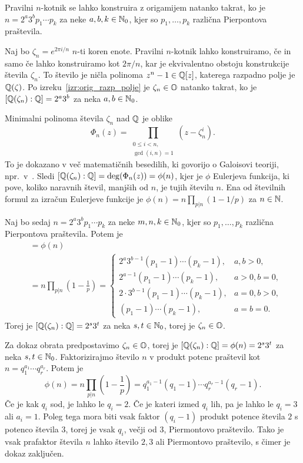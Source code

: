 \begin{izrek}
    Pravilni $n$-kotnik se lahko konstruira z origamijem natanko takrat, ko je $n = 2^a 3^b p_1 \cdots p_k$ za neke $a,b,k \in \mathbb N_0$, kjer so $p_1, \ldots, p_k$ različna Pierpontova praštevila.
\end{izrek}
\begin{dokaz}
    Naj bo $\zeta_n = e^{2 \pi i / n}$ $n$-ti koren enote. Pravilni $n$-kotnik lahko konstruiramo, če in samo če lahko konstruiramo kot $2 \pi / n$, kar je ekvivalentno obstoju konstrukcije števila $\zeta_n$. To število je ničla polinoma $z^n - 1 \in \mathbb Q[z]$, katerega razpadno polje je $\mathbb Q(\zeta)$. Po izreku~\ref{izr:orig_razp_polje} je $\zeta_n \in \mathbb O$ natanko takrat, ko je $[\mathbb Q(\zeta_n) : \mathbb Q] = 2^a3^b$ za neka $a, b \in \mathbb N_0$.

    Minimalni polinoma števila $\zeta_n$ nad $\mathbb Q$ je oblike
    $$ \Phi_n(z) = \prod_{\substack{0 \leq i < n, \\ \gcd(i,n)=1}} (z - \zeta_n^i). $$
    To je dokazano v več matematičnih besedilih, ki govorijo o Galoisovi teoriji, npr.\ v~\cite[poglavje $9.1$]{cox2005}.
    Sledi $[\mathbb Q(\zeta_n) : \mathbb Q] = \deg(\Phi_n(z)) = \phi(n)$, kjer je $\phi$ Eulerjeva funkcija, ki pove, koliko naravnih števil, manjših od $n$, je tujih številu $n$. Ena od številnih formul za izračun Eulerjeve funkcije je $\phi(n) = n \prod_{p|n} (1 - 1/p)$ za $n \in \mathbb N$.

    Naj bo sedaj $n = 2^a 3^b p_1 \cdots p_k$ za neke $m,n,k \in \mathbb N_0$, kjer so $p_1, \ldots, p_k$ različna Pierpontova praštevila. Potem je
    \begin{align*}
        [\Q(\zeta_n) : \Q] &= \phi(n) \\
        &= n \prod_{p|n} (1 - \frac{1}{p}) =
        \begin{cases}
            2^a3^{b-1}(p_1 -1) \cdots (p_k -1), &a,b>0,\\
            2^{a-1}(p_1 -1) \cdots (p_k -1), &a>0, b=0,\\
            2 \cdot 3^{b-1}(p_1 -1) \cdots (p_k -1), &a=0,b>0,\\
            (p_1 -1) \cdots (p_k -1), &a=b=0.
            \end{cases}
    \end{align*}
    Torej je $[\mathbb Q(\zeta_n) : \mathbb Q] = 2^s3^t$ za neka $s,t \in \mathbb N_0$, torej je $\zeta_n \in \mathbb O$.

    Za dokaz obrata predpostavimo $\zeta_n \in \mathbb O$, torej je $[\mathbb Q(\zeta_n) : \mathbb Q] = \phi(n) = 2^s3^t$ za neka $s,t \in \mathbb N_0$. Faktorizirajmo število $n$ v produkt potenc praštevil kot $n = q_1^{a_1} \cdots q_r^{a_r}$. Potem je
    $$ \phi(n) = n \prod_{p|n} (1 - \frac{1}{p}) = q_1^{a_1-1} (q_1 -1) \cdots q_r^{a_r-1} (q_r -1).$$
    Če je kak $q_i$ sod, je lahko le $q_i = 2$. Če je kateri izmed $q_i$ lih, pa je lahko le $q_i = 3$ ali $a_i = 1$. Poleg tega mora biti vsak faktor $(q_i - 1)$ produkt potence števila $2$ s potenco števila $3$, torej je vsak $q_i$, večji od $3$, Piermontovo praštevilo. Tako je vsak prafaktor števila $n$ lahko število $2, 3$ ali Piermontovo praštevilo, s čimer je dokaz zaključen.
\end{dokaz}

